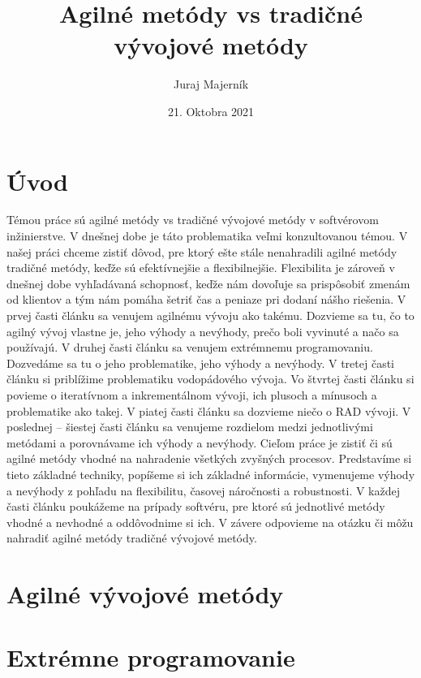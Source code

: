 \documentclass{article}
\begin{document}
\title{Agilné metódy vs tradičné vývojové metódy}
\author{Juraj Majerník}
\date{21. Oktobra 2021}
\maketitle
\begin{abstract}
\end{abstract}
\section{Úvod}
\centering
Témou práce sú agilné metódy vs tradičné vývojové metódy v softvérovom inžinierstve. V dnešnej dobe je táto problematika veľmi konzultovanou témou. 
V našej práci chceme zistiť dôvod, pre ktorý ešte stále nenahradili agilné metódy tradičné metódy, keďže sú efektívnejšie a flexibilnejšie. Flexibilita je zároveň v dnešnej dobe vyhľadávaná schopnosť, keďže nám dovoľuje sa prispôsobiť zmenám od klientov a tým nám pomáha šetriť čas a peniaze pri dodaní nášho riešenia. 
V prvej časti článku sa venujem agilnému vývoju ako takému. Dozvieme sa tu, čo to agilný vývoj vlastne je, jeho výhody a nevýhody, prečo boli vyvinuté a načo sa používajú. 
V druhej časti článku sa venujem extrémnemu programovaniu. Dozvedáme sa tu o jeho problematike, jeho výhody a nevýhody. 
V tretej časti článku si priblížime problematiku vodopádového vývoja. 
Vo štvrtej časti článku si povieme o iteratívnom a inkrementálnom vývoji, ich plusoch a mínusoch a problematike ako takej. 
V piatej časti článku sa dozvieme niečo o RAD vývoji. 
V poslednej – šiestej časti článku sa venujeme rozdielom medzi jednotlivými metódami a porovnávame ich výhody a nevýhody. 
Cieľom práce je zistiť či sú agilné metódy vhodné na nahradenie všetkých zvyšných procesov. Predstavíme si tieto základné techniky, popíšeme si ich základné informácie, vymenujeme výhody a nevýhody z pohľadu na flexibilitu, časovej náročnosti a robustnosti. V každej časti článku poukážeme na prípady softvéru, pre ktoré sú jednotlivé metódy vhodné a nevhodné a oddôvodnime si ich. V závere odpovieme na otázku či môžu nahradiť agilné metódy tradičné vývojové metódy.

\section{Agilné vývojové metódy}
\centering

\section{Extrémne programovanie}
\centering
\end{document}
